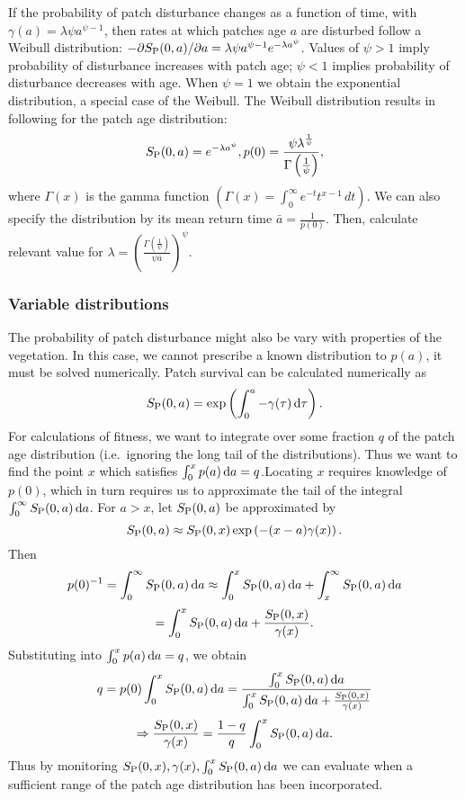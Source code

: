 \documentclass[10pt,twoside]{article}
\begin{document}
If the probability of patch disturbance changes as a function of time,
with \(\gamma(a) = \lambda \psi a^{\psi-1}\), then rates at which
patches age \(a\) are disturbed follow a Weibull distribution:
\(-\partial S_{\rm P}(0,a)/ \partial a = \lambda \psi a^{\psi -1}e^{-\lambda a^\psi}\).
Values of \(\psi>1\) imply probability of disturbance increases with
patch age; \(\psi<1\) implies probability of disturbance decreases with
age. When \(\psi=1\) we obtain the exponential distribution, a special
case of the Weibull. The Weibull distribution results in following for
the patch age distribution:
\[S_{\rm P}(0,a) = e^{-\lambda a^\psi}, p(0) =  \frac{\psi \lambda^{\frac1{\psi}}}{\Gamma\left(\frac1{\psi}\right)},\]
where \(\Gamma(x)\) is the gamma function
\(\left(\Gamma(x) = \int_{0}^{\infty}e^{-t}t^{x-1}\, dt\right)\). We can
also specify the distribution by its mean return time
\(\bar{a} = \frac1{p(0)}\). Then, calculate relevant value for
\(\lambda = \left(\frac{\Gamma\left(\frac1{\psi}\right)}{\psi \bar{a}}\right)^{\psi}\).

\subsubsection{Variable distributions}\label{variable-distributions}

The probability of patch disturbance might also be vary with properties
of the vegetation. In this case, we cannot prescribe a known
distribution to \(p(a)\), it must be solved numerically. Patch survival
can be calculated numerically as
\[S_{\rm P}(0,a) = \exp \left( \int_{0}^{a}-\gamma(\tau)\,{\rm d}\tau\right).\]
For calculations of fitness, we want to integrate over some fraction
\(q\) of the patch age distribution (i.e.~ignoring the long tail of the
distributions). Thus we want to find the point \(x\) which satisfies
\(\int_{0}^{x} p(a)\,{\rm d}a =q\).Locating \(x\) requires knowledge of
\(p(0)\), which in turn requires us to approximate the tail of the
integral \(\int_{0}^{\infty} S_{\rm P}(0,a)\,{\rm d}a\). For \(a > x\), let
\(S_{\rm P}(0,a)\) be approximated by
\[S_{\rm P}(0,a) \approx S_{\rm P}(0,x) \exp\left( - (x-a) \gamma(x)\right).\] Then
\[p(0)^{-1} =\int_{0}^{\infty} S_{\rm P}(0,a)\,{\rm d}a \approx \int_{0}^{x} S_{\rm P}(0,a)\,{\rm d}a + \int_{x}^{\infty } S_{\rm P}(0,a)\,{\rm d}a\]
\[ = \int_{0}^{x} S_{\rm P}(0,a)\,{\rm d}a + \frac{S_{\rm P}(0,x)}{\gamma(x)}. \]
Substituting into \(\int_{0}^{x} p(a)\,{\rm d}a =q\), we obtain
\[q=  p(0) \int_{0}^{x} S_{\rm P}(0,a) \, {\rm d}a = \frac{\int_{0}^{x} S_{\rm P}(0,a) \, {\rm d}a}{\int_{0}^{x} S_{\rm P}(0,a)\,{\rm d}a + \frac{S_{\rm P}(0,x)}{\gamma(x)}}\]
\[\Rightarrow  \frac{S_{\rm P}(0,x)}{\gamma(x)} = \frac{1-q}{q} \int_{0}^{x} S_{\rm P}(0,a) \, {\rm d}a.\]
Thus by monitoring
\(S_{\rm P}(0,x), \gamma(x), \int_{0}^{x} S_{\rm P}(0,a) \, {\rm d}a\) we can evaluate
when a sufficient range of the patch age distribution has been
incorporated.
\end{document}
